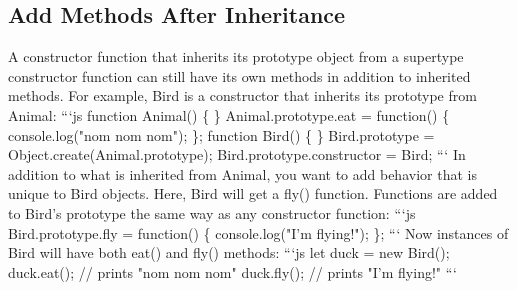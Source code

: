\documentclass{article}%
\begin{document}
%
\subsection{Add Methods After Inheritance}%
\label{subsec:AddMethodsAfterInheritance}%
A constructor function that inherits its prototype object from a supertype constructor function can still have its own methods in addition to inherited methods.\newline%
For example, Bird is a constructor that inherits its prototype from Animal:\newline%
```js\newline%
function Animal() \{ \}\newline%
Animal.prototype.eat = function() \{\newline%
  console.log("nom nom nom");\newline%
\};\newline%
function Bird() \{ \}\newline%
Bird.prototype = Object.create(Animal.prototype);\newline%
Bird.prototype.constructor = Bird;\newline%
```\newline%
In addition to what is inherited from Animal, you want to add behavior that is unique to Bird objects. Here, Bird will get a fly() function. Functions are added to Bird's prototype the same way as any constructor function:\newline%
```js\newline%
Bird.prototype.fly = function() \{\newline%
  console.log("I'm flying!");\newline%
\};\newline%
```\newline%
Now instances of Bird will have both eat() and fly() methods:\newline%
```js\newline%
let duck = new Bird();\newline%
duck.eat(); // prints "nom nom nom"\newline%
duck.fly(); // prints "I'm flying!"\newline%
```\newline%

%
\end{document}
